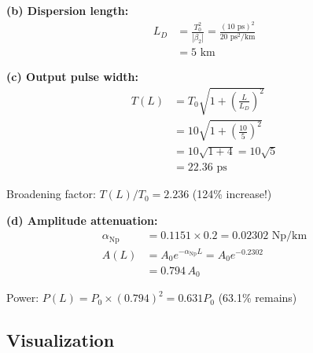 \documentclass[12pt]{article}
\begin{document}
\textbf{(b) Dispersion length:}
\begin{align}
L_D &= \frac{T_0^2}{|\beta_2|} = \frac{(10 \text{ ps})^2}{20 \text{ ps}^2/\text{km}} \\
&= \boxed{5 \text{ km}}
\end{align}

\textbf{(c) Output pulse width:}
\begin{align}
T(L) &= T_0 \sqrt{1 + \left(\frac{L}{L_D}\right)^2} \\
&= 10 \sqrt{1 + \left(\frac{10}{5}\right)^2} \\
&= 10\sqrt{1 + 4} = 10\sqrt{5} \\
&= \boxed{22.36 \text{ ps}}
\end{align}

Broadening factor: $T(L)/T_0 = 2.236$ (124\% increase!)

\textbf{(d) Amplitude attenuation:}
\begin{align}
\alpha_{\text{Np}} &= 0.1151 \times 0.2 = 0.02302 \text{ Np/km} \\
A(L) &= A_0 e^{-\alpha_{\text{Np}} L} = A_0 e^{-0.2302} \\
&= \boxed{0.794 \, A_0}
\end{align}

Power: $P(L) = P_0 \times (0.794)^2 = 0.631 P_0$ (63.1\% remains)

\subsection{Visualization}

\begin{center}
\end{center}
\end{document}
